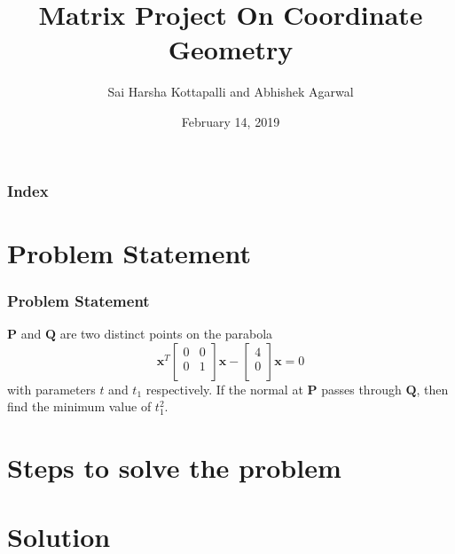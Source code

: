 \documentclass[12pt]{beamer}
\title[Intro to ML and AI]{Matrix Project On Coordinate Geometry}
\author{Sai Harsha Kottapalli and Abhishek Agarwal}
\institute[IITH]
{
Indian Institute of Technology Hyderabad
\medskip
}
\date{February 14, 2019}
\begin{document}
\begin{frame}
\titlepage
\end{frame}

\begin{frame}
\frametitle{Index}
\tableofcontents
\end{frame}

\section{Problem Statement}


\begin{frame}
\frametitle{Problem Statement}
$\textbf{P}$ and $\textbf{Q}$ are two distinct points on the parabola
\[
\textbf{x}^T
\begin{bmatrix}
    0 & 0\\
    0 & 1\\  
\end{bmatrix}
\textbf{x}  -  
\begin{bmatrix}
    4\\
    0\\  
\end{bmatrix}
\textbf{x} = 0
\]
with parameters $t$ and $t_1$ respectively.  If the normal at $\textbf{P} $ passes through $\textbf{Q}$, then find 
the minimum value of $t_1^2$.
\end{frame}


\section{Steps to solve the problem}

\section{Solution}
\end{document}
